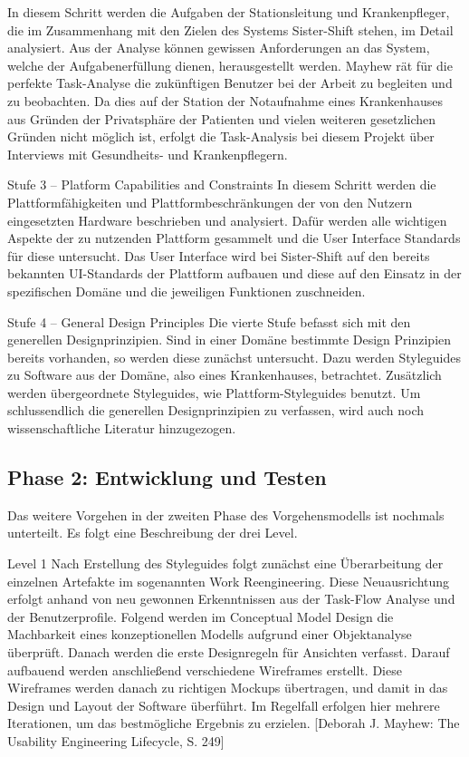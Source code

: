\documentclass[11pt,
paper=a4,
bibtotocnumbered,	  %
liststotocnumbered,  %
DIV=calc,		  %
tablecaptionabove,	  %
headinclude,
]{article}
\begin{document}
In diesem Schritt werden die Aufgaben der Stationsleitung und Krankenpfleger, die im Zusammenhang mit den Zielen des Systems Sister-Shift stehen, im Detail analysiert. Aus der Analyse können gewissen Anforderungen an das System, welche der Aufgabenerfüllung dienen, herausgestellt werden. Mayhew rät für die perfekte Task-Analyse die zukünftigen Benutzer bei der Arbeit zu begleiten und zu beobachten. Da dies auf der Station der Notaufnahme eines Krankenhauses aus Gründen der Privatsphäre der Patienten und vielen weiteren gesetzlichen Gründen nicht möglich ist, erfolgt die Task-Analysis bei diesem Projekt über Interviews mit Gesundheits- und Krankenpflegern.


Stufe 3 – Platform Capabilities and Constraints
In diesem Schritt werden die Plattformfähigkeiten und Plattformbeschränkungen der von den Nutzern eingesetzten Hardware beschrieben und analysiert. Dafür werden alle wichtigen Aspekte der zu nutzenden Plattform gesammelt und die User Interface Standards für diese untersucht. Das User Interface wird bei Sister-Shift auf den bereits bekannten UI-Standards der Plattform aufbauen und diese auf den Einsatz in der spezifischen Domäne und die jeweiligen Funktionen zuschneiden.

Stufe 4 – General Design Principles
Die vierte Stufe befasst sich mit den generellen Designprinzipien. 
Sind in einer Domäne bestimmte Design Prinzipien bereits vorhanden, so werden diese zunächst untersucht. Dazu werden Styleguides zu Software aus der Domäne, also eines Krankenhauses, betrachtet. Zusätzlich werden übergeordnete Styleguides, wie Plattform-Styleguides benutzt. Um schlussendlich die generellen Designprinzipien zu verfassen, wird auch noch wissenschaftliche Literatur hinzugezogen.
\subsection{Phase 2: Entwicklung und Testen}
 Das weitere Vorgehen in der zweiten Phase des Vorgehensmodells ist nochmals unterteilt. Es folgt eine Beschreibung der drei Level.

Level 1
Nach Erstellung des Styleguides folgt zunächst eine Überarbeitung der einzelnen Artefakte im sogenannten Work Reengineering. Diese Neuausrichtung erfolgt anhand von neu gewonnen Erkenntnissen aus der Task-Flow Analyse und der Benutzerprofile. Folgend werden im Conceptual Model Design die Machbarkeit eines konzeptionellen Modells aufgrund einer Objektanalyse überprüft. Danach werden die erste Designregeln für Ansichten verfasst. Darauf aufbauend werden anschließend verschiedene Wireframes erstellt. Diese Wireframes werden danach zu richtigen Mockups übertragen, und damit in das Design und Layout der Software überführt. Im Regelfall erfolgen hier mehrere Iterationen, um das bestmögliche Ergebnis zu erzielen. [Deborah J. Mayhew: The Usability Engineering Lifecycle, S. 249]
\end{document}
